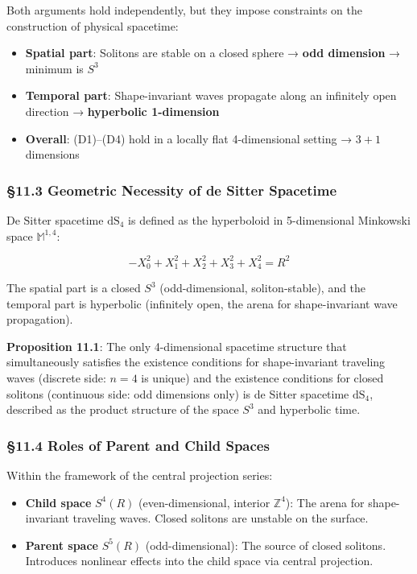 \documentclass[
  a4paper,11pt]{article}
\providecommand{\tightlist}{%
  \setlength{\itemsep}{0pt}\setlength{\parskip}{0pt}}
\theoremstyle{definition}
\theoremstyle{remark}
\begin{document}
Both arguments hold independently, but they impose constraints on the
construction of physical spacetime:

\begin{itemize}
\tightlist
\item
  \textbf{Spatial part}: Solitons are stable on a closed sphere →
  \textbf{odd dimension} → minimum is \(S^3\)
\item
  \textbf{Temporal part}: Shape-invariant waves propagate along an
  infinitely open direction → \textbf{hyperbolic 1-dimension}
\item
  \textbf{Overall}: (D1)--(D4) hold in a locally flat 4-dimensional
  setting → \(3 + 1\) dimensions
\end{itemize}

\subsubsection{§11.3 Geometric Necessity of de Sitter
Spacetime}\label{geometric-necessity-of-de-sitter-spacetime}

De Sitter spacetime \(\mathrm{dS}_4\) is defined as the hyperboloid in
5-dimensional Minkowski space \(\mathbb{M}^{1,4}\):

\[-X_0^2 + X_1^2 + X_2^2 + X_3^2 + X_4^2 = R^2\]

The spatial part is a closed \(S^3\) (odd-dimensional, soliton-stable),
and the temporal part is hyperbolic (infinitely open, the arena for
shape-invariant wave propagation).

\textbf{Proposition 11.1}: The only 4-dimensional spacetime structure
that simultaneously satisfies the existence conditions for
shape-invariant traveling waves (discrete side: \(n = 4\) is unique) and
the existence conditions for closed solitons (continuous side: odd
dimensions only) is de Sitter spacetime \(\mathrm{dS}_4\), described as
the product structure of the space \(S^3\) and hyperbolic time.

\subsubsection{§11.4 Roles of Parent and Child
Spaces}\label{roles-of-parent-and-child-spaces}

Within the framework of the central projection series:

\begin{itemize}
\tightlist
\item
  \textbf{Child space} \(S^4(R)\) (even-dimensional, interior
  \(\mathbb{Z}^4\)): The arena for shape-invariant traveling waves.
  Closed solitons are unstable on the surface.
\item
  \textbf{Parent space} \(S^5(R)\) (odd-dimensional): The source of
  closed solitons. Introduces nonlinear effects into the child space via
  central projection.
\end{itemize}
\end{document}
